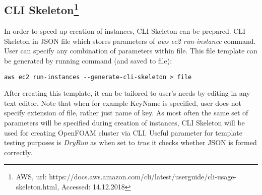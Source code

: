 \documentclass[12pt,english]{article}
\begin{document}
\subsection{CLI Skeleton\footnote{AWS, url: https://docs.aws.amazon.com/cli/latest/userguide/cli-usage-skeleton.html, Accessed: 14.12.2018}}

In order to speed up creation of instances, CLI Skeleton can be prepared. CLI Skeleton in JSON file which stores parameters of \textit{aws ec2 run-instance} command. User can specify any combination of parameters within file. This file template can be generated by running command (and saved to file):
\begin{lstlisting}
aws ec2 run-instances --generate-cli-skeleton > file
\end{lstlisting}
After creating this template, it can be tailored to user's needs by editing in any text editor. Note that when for example KeyName is specified, user does not specify extension of file, rather just name of key. As most often the same set of parameters will be specified during creation of instances, CLI Skeleton will be used for creating OpenFOAM cluster via CLI. Useful parameter for template testing purposes is \textit{DryRun} as when set to \textit{true} it checks whether JSON is formed correctly.
\end{document}
